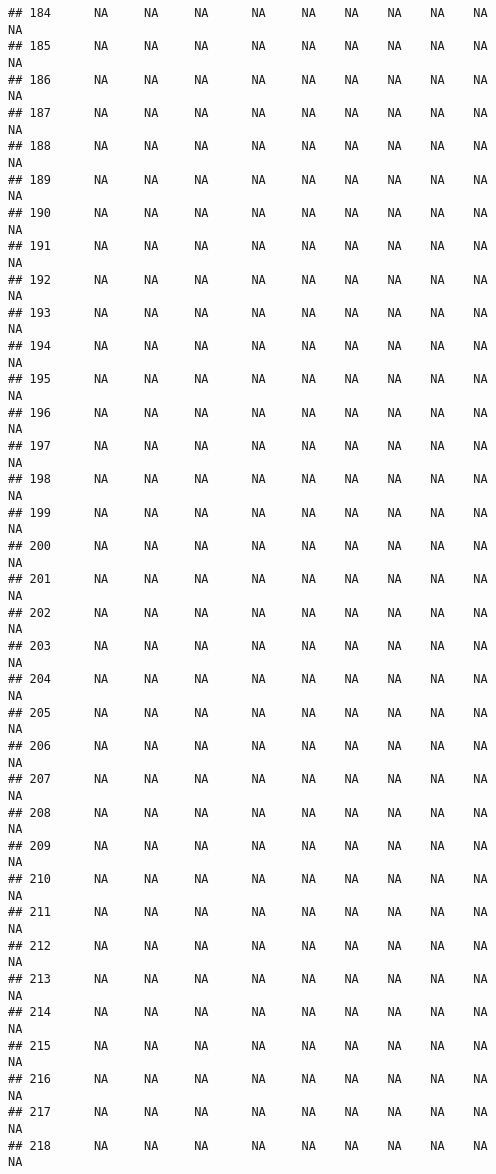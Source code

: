 \documentclass{article}\usepackage{graphicx, color}
\makeatletter
\newenvironment{kframe}{%
 \def\at@end@of@kframe{}%
 \ifinner\ifhmode%
  \def\at@end@of@kframe{\end{minipage}}%
  \begin{minipage}{\columnwidth}%
 \fi\fi%
 \def\FrameCommand##1{\hskip\@totalleftmargin \hskip-\fboxsep
 \colorbox{shadecolor}{##1}\hskip-\fboxsep
     \hskip-\linewidth \hskip-\@totalleftmargin \hskip\columnwidth}%
 \MakeFramed {\advance\hsize-\width
   \@totalleftmargin\z@ \linewidth\hsize
   \@setminipage}}%
 {\par\unskip\endMakeFramed%
 \at@end@of@kframe}
\newenvironment{knitrout}{}{} %
\makeatother
\begin{document}
\begin{knitrout}
\begin{kframe}
\begin{verbatim}
## 184      NA     NA     NA      NA     NA    NA    NA    NA    NA     NA
## 185      NA     NA     NA      NA     NA    NA    NA    NA    NA     NA
## 186      NA     NA     NA      NA     NA    NA    NA    NA    NA     NA
## 187      NA     NA     NA      NA     NA    NA    NA    NA    NA     NA
## 188      NA     NA     NA      NA     NA    NA    NA    NA    NA     NA
## 189      NA     NA     NA      NA     NA    NA    NA    NA    NA     NA
## 190      NA     NA     NA      NA     NA    NA    NA    NA    NA     NA
## 191      NA     NA     NA      NA     NA    NA    NA    NA    NA     NA
## 192      NA     NA     NA      NA     NA    NA    NA    NA    NA     NA
## 193      NA     NA     NA      NA     NA    NA    NA    NA    NA     NA
## 194      NA     NA     NA      NA     NA    NA    NA    NA    NA     NA
## 195      NA     NA     NA      NA     NA    NA    NA    NA    NA     NA
## 196      NA     NA     NA      NA     NA    NA    NA    NA    NA     NA
## 197      NA     NA     NA      NA     NA    NA    NA    NA    NA     NA
## 198      NA     NA     NA      NA     NA    NA    NA    NA    NA     NA
## 199      NA     NA     NA      NA     NA    NA    NA    NA    NA     NA
## 200      NA     NA     NA      NA     NA    NA    NA    NA    NA     NA
## 201      NA     NA     NA      NA     NA    NA    NA    NA    NA     NA
## 202      NA     NA     NA      NA     NA    NA    NA    NA    NA     NA
## 203      NA     NA     NA      NA     NA    NA    NA    NA    NA     NA
## 204      NA     NA     NA      NA     NA    NA    NA    NA    NA     NA
## 205      NA     NA     NA      NA     NA    NA    NA    NA    NA     NA
## 206      NA     NA     NA      NA     NA    NA    NA    NA    NA     NA
## 207      NA     NA     NA      NA     NA    NA    NA    NA    NA     NA
## 208      NA     NA     NA      NA     NA    NA    NA    NA    NA     NA
## 209      NA     NA     NA      NA     NA    NA    NA    NA    NA     NA
## 210      NA     NA     NA      NA     NA    NA    NA    NA    NA     NA
## 211      NA     NA     NA      NA     NA    NA    NA    NA    NA     NA
## 212      NA     NA     NA      NA     NA    NA    NA    NA    NA     NA
## 213      NA     NA     NA      NA     NA    NA    NA    NA    NA     NA
## 214      NA     NA     NA      NA     NA    NA    NA    NA    NA     NA
## 215      NA     NA     NA      NA     NA    NA    NA    NA    NA     NA
## 216      NA     NA     NA      NA     NA    NA    NA    NA    NA     NA
## 217      NA     NA     NA      NA     NA    NA    NA    NA    NA     NA
## 218      NA     NA     NA      NA     NA    NA    NA    NA    NA     NA

\end{verbatim}
\end{kframe}
\end{knitrout}
\end{document}
